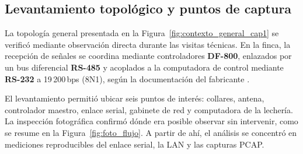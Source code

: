 \subsection{Levantamiento topológico y puntos de captura}
La topología general presentada en la Figura~\ref{fig:contexto_general_cap1} se verificó mediante observación directa durante las visitas técnicas. En la finca, la recepción de señales se coordina mediante controladores \textbf{DF-800}, enlazados por un bus diferencial \textbf{RS-485} y acoplados a la computadora de control mediante \textbf{RS-232} a 19\,200\,bps (8N1), según la documentación del fabricante \cite{allflex2021,sensehub2023}.

El levantamiento permitió ubicar seis puntos de interés: collares, antena, controlador maestro, enlace serial, gabinete de red y computadora de la lechería. La inspección fotográfica confirmó dónde era posible observar sin intervenir, como se resume en la Figura~\ref{fig:foto_flujo}. A partir de ahí, el análisis se concentró en mediciones reproducibles del enlace serial, la \ac{LAN} y las capturas \ac{PCAP}.

